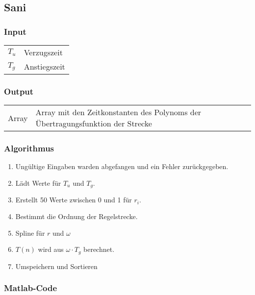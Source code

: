 \subsection{Sani}
\label{app:sani}

\subsubsection*{Input}

\begin{tabular}{p{40mm}l}
    $ T_u $ & Verzugszeit \\
    $ T_g $ & Anstiegszeit
\end{tabular}

\subsubsection*{Output}
\begin{tabular}{p{40mm}l}
    Array & \parbox[t][4em][s]{0.7\textwidth}{Array mit den Zeitkonstanten des Polynoms der \"Ubertragungsfunktion der Strecke}
\end{tabular}

\subsubsection*{Algorithmus}
\begin{enumerate}
    \item
        Ung\"ultige Eingaben warden abgefangen und ein Fehler zur\"uckgegeben.
    \item
        L\"adt Werte f\"ur $T_u$ und $T_g$.
    \item
        Erstellt 50 Werte zwischen 0 und 1 f\"ur $r_i$.
    \item
        Bestimmt die Ordnung der Regelstrecke.
    \item
        Spline f\"ur $r$ und $\omega$ 
    \item
        $T(n)$ wird aus $\omega \cdot T_g$ berechnet.
    \item
        Umspeichern und Sortieren
\end{enumerate}

\subsubsection*{Matlab-Code}



